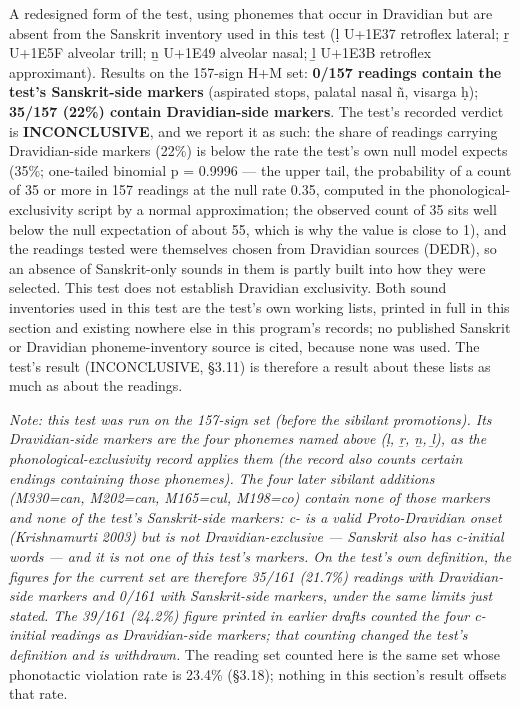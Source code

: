 \documentclass[11pt]{article}
\newcounter{none} %
\begin{document}
A redesigned form of the test, using phonemes that occur in Dravidian but are absent from the Sanskrit inventory used in this test (ḷ U+1E37 retroflex lateral; ṟ U+1E5F alveolar trill; ṉ U+1E49 alveolar nasal; ḻ U+1E3B retroflex approximant). Results on the 157-sign H+M set: \textbf{0/157 readings contain the test's Sanskrit-side markers} (aspirated stops, palatal nasal ñ, visarga ḥ); \textbf{35/157 (22\%) contain Dravidian-side markers}. The test's recorded verdict is \textbf{INCONCLUSIVE}, and we report it as such: the share of readings carrying Dravidian-side markers (22\%) is below the rate the test's own null model expects (35\%; one-tailed binomial p = 0.9996 --- the upper tail, the probability of a count of 35 or more in 157 readings at the null rate 0.35, computed in the phonological-exclusivity script by a normal approximation; the observed count of 35 sits well below the null expectation of about 55, which is why the value is close to 1), and the readings tested were themselves chosen from Dravidian sources (DEDR), so an absence of Sanskrit-only sounds in them is partly built into how they were selected. This test does not establish Dravidian exclusivity. Both sound inventories used in this test are the test's own working lists, printed in full in this section and existing nowhere else in this program's records; no published Sanskrit or Dravidian phoneme-inventory source is cited, because none was used. The test's result (INCONCLUSIVE, §3.11) is therefore a result about these lists as much as about the readings.

\emph{Note: this test was run on the 157-sign set (before the sibilant promotions). Its Dravidian-side markers are the four phonemes named above (ḷ, ṟ, ṉ, ḻ), as the phonological-exclusivity record applies them (the record also counts certain endings containing those phonemes). The four later sibilant additions (M330=can, M202=can, M165=cul, M198=co) contain none of those markers and none of the test's Sanskrit-side markers: c- is a valid Proto-Dravidian onset (Krishnamurti 2003) but is not Dravidian-exclusive --- Sanskrit also has c-initial words --- and it is not one of this test's markers. On the test's own definition, the figures for the current set are therefore 35/161 (21.7\%) readings with Dravidian-side markers and 0/161 with Sanskrit-side markers, under the same limits just stated. The 39/161 (24.2\%) figure printed in earlier drafts counted the four c-initial readings as Dravidian-side markers; that counting changed the test's definition and is withdrawn.} The reading set counted here is the same set whose phonotactic violation rate is 23.4\% (§3.18); nothing in this section's result offsets that rate.
\end{document}

